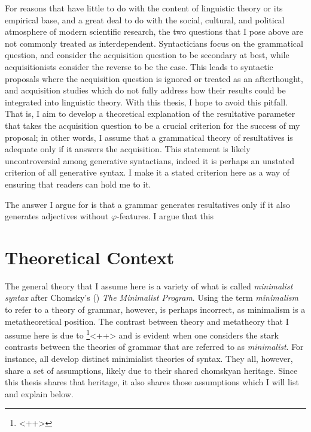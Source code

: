 \documentclass[MilwayThesis]{subfiles}
\begin{document}
For reasons that have little to do with the content of linguistic theory or its empirical base, and a great deal to do with the social, cultural, and political atmosphere of modern scientific research, the two questions that I pose above are not commonly treated as interdependent.
Syntacticians focus on the grammatical question, and consider the acquisition question to be secondary at best, while acquisitionists consider the reverse to be the case.
This leads to syntactic proposals where the acquisition question is ignored or treated as an afterthought, and acquisition studies which do not fully address how their results could be integrated into linguistic theory.
With this thesis, I hope to avoid this pitfall.
That is, I aim to develop a theoretical explanation of the resultative parameter that takes the acquisition question to be a crucial criterion for the success of my proposal; in other words, I assume that a grammatical theory of resultatives is adequate only if it answers the acquisition.
This statement is likely uncontroversial among generative syntactians, indeed it is perhaps an unstated criterion of all generative syntax.
I make it a stated criterion here as a way of ensuring that readers can hold me to it.

The answer I argue for is that a grammar generates resultatives only if it also generates adjectives without $\varphi$-features.
I argue that this 

\section{Theoretical Context}
The general theory that I assume here is a variety of what is called \textit{minimalist syntax} after Chomsky's (\citeyear{chomsky1995minimalist}) \textit{The Minimalist Program}.
Using the term \textit{minimalism} to refer to a theory of grammar, however, is perhaps incorrect, as minimalism is a metatheoretical position.
The contrast between theory and metatheory that I assume here is due to \textcite{chametzky1996theory}\footnote{
<++>
}<++> and is evident when one considers the stark contrasts between the theories of grammar that are referred to as \textit{minimalist}.
For instance, \textcite{chomsky2000minimalist,hornstein2009theory,frampton2008crash,epstein???} all develop distinct minimialist theories of syntax.
They all, however, share a set of assumptions, likely due to their shared chomskyan heritage.
Since this thesis shares that heritage, it also shares those assumptions which I will list and explain below.
\end{document}
